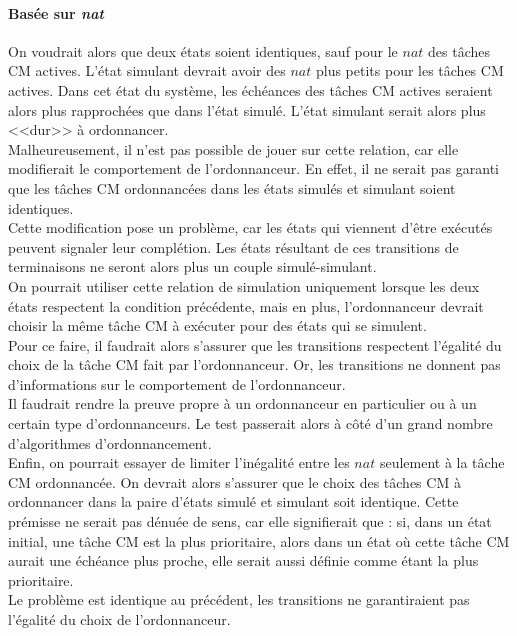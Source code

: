 \documentclass[12pt,a4paper,oneside]{book}
\theoremstyle{break}
\theoremstyle{breakplain}
\begin{document}
\paragraph{Basée sur \textit{nat}}
On voudrait alors que deux états soient identiques, sauf pour le $nat$ des tâches CM actives. L'état simulant devrait avoir des $nat$ plus petits pour les tâches CM actives. Dans cet état du système, les échéances des tâches CM actives seraient alors plus rapprochées que dans l'état simulé. L'état simulant serait alors plus <<dur>> à ordonnancer.\\

Malheureusement, il n'est pas possible de jouer sur cette relation, car elle modifierait le comportement de l'ordonnanceur. En effet, il ne serait pas garanti que les tâches CM ordonnancées dans les états simulés et simulant soient identiques.\\
Cette modification pose un problème, car les états qui viennent d'être exécutés peuvent signaler leur complétion. Les états résultant de ces transitions de terminaisons ne seront alors plus un couple simulé-simulant.\\

On pourrait utiliser cette relation de simulation uniquement lorsque les deux états respectent la condition précédente, mais en plus, l'ordonnanceur devrait choisir la même tâche CM à exécuter pour des états qui se simulent.\\
Pour ce faire, il faudrait alors s'assurer que les transitions respectent l'égalité du choix de la tâche CM fait par l'ordonnanceur. Or, les transitions ne donnent pas d'informations sur le comportement de l'ordonnanceur.\\
Il faudrait rendre la preuve propre à un ordonnanceur en particulier ou à un certain type d'ordonnanceurs. Le test passerait alors à côté d'un grand nombre d'algorithmes d'ordonnancement.\\

Enfin, on pourrait essayer de limiter l'inégalité entre les $nat$ seulement à la tâche CM ordonnancée. On devrait alors s'assurer que le choix des tâches CM à ordonnancer dans la paire d'états simulé et simulant soit identique. Cette prémisse ne serait pas dénuée de sens, car elle signifierait que : si, dans un état initial, une tâche CM est la plus prioritaire, alors dans un état où cette tâche CM aurait une échéance plus proche, elle serait aussi définie comme étant la plus prioritaire.\\
Le problème est identique au précédent, les transitions ne garantiraient pas l'égalité du choix de l'ordonnanceur.\\
\end{document}
